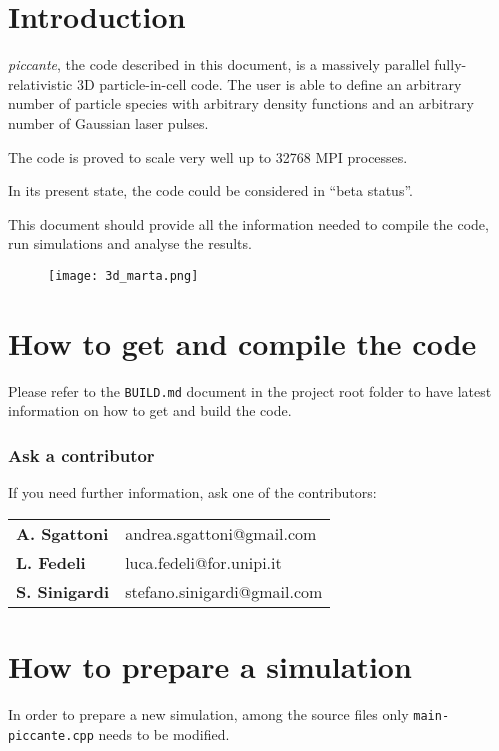 \documentclass[11pt,a4paper]{report}
\begin{document}
\chapter{Introduction}
\emph{piccante}, the code described in this document, is a massively parallel fully-relativistic 3D particle-in-cell code. The user is able to define an arbitrary number of particle species with arbitrary density functions and an arbitrary number of Gaussian laser pulses.

The code is proved to scale very well up to 32768 MPI processes.

In its present state, the code could be considered in ``beta status''.

This document should provide all the information needed to compile the code, run simulations and analyse the results.
\begin{figure}[h!]
\centering
\texttt{[image: 3d\_marta.png]}
\end{figure}



\chapter{How to get and compile the code}
Please refer to the \verb+BUILD.md+ document in the project root folder to have latest information on how to get and build the code.

\subsection{Ask a contributor}
If you need further information, ask one of the contributors:
\begin{center}
    \begin{tabular}{ l l }
    	\textbf{A. Sgattoni}  & andrea.sgattoni@gmail.com    \\
    	\textbf{L. Fedeli}    & luca.fedeli@for.unipi.it     \\
    	\textbf{S. Sinigardi} & stefano.sinigardi@gmail.com
    \end{tabular}
\end{center}




\chapter{How to prepare a simulation}
In order to prepare a new simulation, among the source files only \verb+main-piccante.cpp+ needs to be modified.
\end{document}
